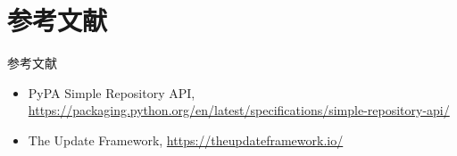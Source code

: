 \documentclass[presentation]{beamer}
\begin{document}
\section{参考文献}
\label{sec:org61d9b54}
\begin{frame}[label={sec:org21594f8}]{参考文献}
\begin{itemize}
\item PyPA Simple Repository API, \url{https://packaging.python.org/en/latest/specifications/simple-repository-api/}
\item The Update Framework, \url{https://theupdateframework.io/}
\end{itemize}
\end{frame}
\end{document}
